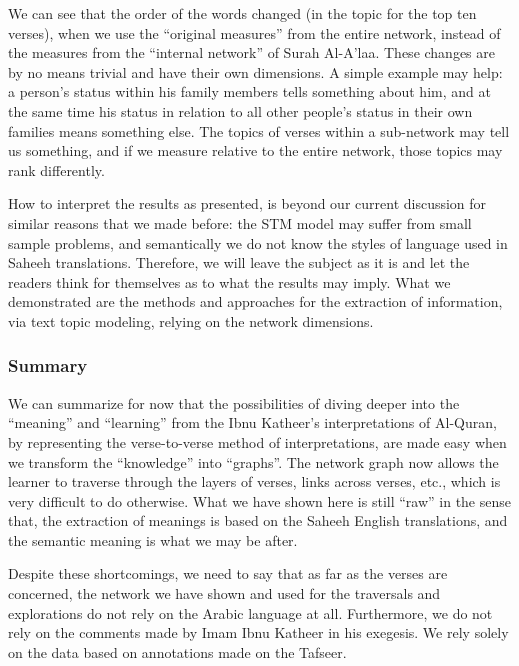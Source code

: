 \documentclass[
]{article}
\begin{document}
\normalsize

We can see that the order of the words changed (in the topic for the top ten verses), when we use the ``original measures'' from the entire network, instead of the measures from the ``internal network'' of Surah Al-A'laa. These changes are by no means trivial and have their own dimensions. A simple example may help: a person's status within his family members tells something about him, and at the same time his status in relation to all other people's status in their own families means something else. The topics of verses within a sub-network may tell us something, and if we measure relative to the entire network, those topics may rank differently.

How to interpret the results as presented, is beyond our current discussion for similar reasons that we made before: the STM model may suffer from small sample problems, and semantically we do not know the styles of language used in Saheeh translations. Therefore, we will leave the subject as it is and let the readers think for themselves as to what the results may imply. What we demonstrated are the methods and approaches for the extraction of information, via text topic modeling, relying on the network dimensions.

\hypertarget{summary-1}{%
\subsubsection{Summary}\label{summary-1}}

We can summarize for now that the possibilities of diving deeper into the ``meaning'' and ``learning'' from the Ibnu Katheer's interpretations of Al-Quran, by representing the verse-to-verse method of interpretations, are made easy when we transform the ``knowledge'' into ``graphs''. The network graph now allows the learner to traverse through the layers of verses, links across verses, etc., which is very difficult to do otherwise. What we have shown here is still ``raw'' in the sense that, the extraction of meanings is based on the Saheeh English translations, and the semantic meaning is what we may be after.

Despite these shortcomings, we need to say that as far as the verses are concerned, the network we have shown and used for the traversals and explorations do not rely on the Arabic language at all. Furthermore, we do not rely on the comments made by Imam Ibnu Katheer in his exegesis. We rely solely on the data based on annotations made on the Tafseer.
\end{document}
